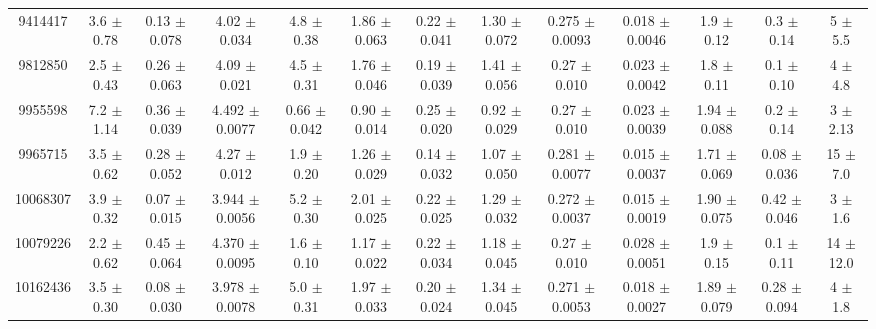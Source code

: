 \begin{table}[H]
\begin{tabular}{c|cccccc|cccccc}
9414417  &        3.6    $\pm$  0.78   &      0.13   $\pm$  0.078  &      4.02   $\pm$  0.034  &      4.8    $\pm$  0.38   &      1.86   $\pm$  0.063  &      0.22   $\pm$  0.041    &        1.30   $\pm$  0.072    &        0.275  $\pm$  0.0093   &        0.018  $\pm$  0.0046   &        1.9    $\pm$  0.12     &        0.3    $\pm$  0.14     &        5      $\pm$  5.5      \\
9812850  &        2.5    $\pm$  0.43   &      0.26   $\pm$  0.063  &      4.09   $\pm$  0.021  &      4.5    $\pm$  0.31   &      1.76   $\pm$  0.046  &      0.19   $\pm$  0.039    &        1.41   $\pm$  0.056    &        0.27   $\pm$  0.010    &        0.023  $\pm$  0.0042   &        1.8    $\pm$  0.11     &        0.1    $\pm$  0.10     &        4      $\pm$  4.8      \\
9955598  &        7.2    $\pm$  1.14   &      0.36   $\pm$  0.039  &      4.492  $\pm$  0.0077 &      0.66   $\pm$  0.042  &      0.90   $\pm$  0.014  &      0.25   $\pm$  0.020    &        0.92   $\pm$  0.029    &        0.27   $\pm$  0.010    &        0.023  $\pm$  0.0039   &        1.94   $\pm$  0.088    &        0.2    $\pm$  0.14     &        3      $\pm$  2.13     \\
9965715  &        3.5    $\pm$  0.62   &      0.28   $\pm$  0.052  &      4.27   $\pm$  0.012  &      1.9    $\pm$  0.20   &      1.26   $\pm$  0.029  &      0.14   $\pm$  0.032    &        1.07   $\pm$  0.050    &        0.281  $\pm$  0.0077   &        0.015  $\pm$  0.0037   &        1.71   $\pm$  0.069    &        0.08   $\pm$  0.036    &       15      $\pm$  7.0      \\
10068307 &        3.9    $\pm$  0.32   &      0.07   $\pm$  0.015  &      3.944  $\pm$  0.0056 &      5.2    $\pm$  0.30   &      2.01   $\pm$  0.025  &      0.22   $\pm$  0.025    &        1.29   $\pm$  0.032    &        0.272  $\pm$  0.0037   &        0.015  $\pm$  0.0019   &        1.90   $\pm$  0.075    &        0.42   $\pm$  0.046    &        3      $\pm$  1.6      \\
10079226 &        2.2    $\pm$  0.62   &      0.45   $\pm$  0.064  &      4.370  $\pm$  0.0095 &      1.6    $\pm$  0.10   &      1.17   $\pm$  0.022  &      0.22   $\pm$  0.034    &        1.18   $\pm$  0.045    &        0.27   $\pm$  0.010    &        0.028  $\pm$  0.0051   &        1.9    $\pm$  0.15     &        0.1    $\pm$  0.11     &        14     $\pm$  12.0     \\
10162436 &        3.5    $\pm$  0.30   &      0.08   $\pm$  0.030  &      3.978  $\pm$  0.0078 &      5.0    $\pm$  0.31   &      1.97   $\pm$  0.033  &      0.20   $\pm$  0.024    &        1.34   $\pm$  0.045    &        0.271  $\pm$  0.0053   &        0.018  $\pm$  0.0027   &        1.89   $\pm$  0.079    &        0.28   $\pm$  0.094    &        4      $\pm$  1.8      \\

\end{tabular}
\end{table}
